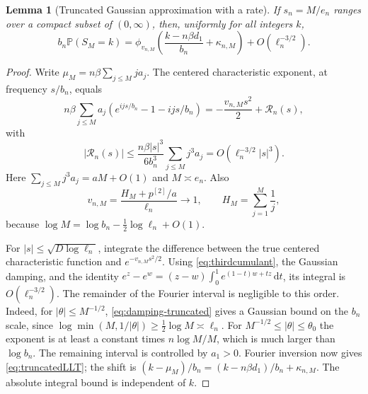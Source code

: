 \documentclass[11pt,a4paper]{article}
\numberwithin{equation}{section}
\newtheorem{lemma}[theorem]{Lemma}
\theoremstyle{definition}
\theoremstyle{remark}
\newcommand{\Prob}{\mathbb P}
\newcommand{\dd}{\,\mathrm d}
\newcommand{\ph}{\phi}
\begin{document}
\begin{lemma}[Truncated Gaussian approximation with a rate]
\label{lem:truncated}
If $s_n=M/e_n$ ranges over a compact subset of $(0,\infty)$, then,
uniformly for all integers $k$,
\begin{equation}\label{eq:truncatedLLT}
 b_n\Prob(S_M=k)
 =\ph_{v_{n,M}}\left(\frac{k-n\beta d_1}{b_n}
                         +\kappa_{n,M}\right)
       +O(\ell_n^{-3/2}).
\end{equation}
\end{lemma}
\begin{proof}
Write $\mu_M=n\beta\sum_{j\le M}j a_j$. The centered characteristic
exponent, at frequency $s/b_n$, equals
\[
 n\beta\sum_{j\le M}a_j
     (e^{ijs/b_n}-1-ijs/b_n)
   =-\frac{v_{n,M}s^2}{2}+\mathcal R_n(s),
\]
with
\begin{equation}\label{eq:thirdcumulant}
 |\mathcal R_n(s)|\le
 \frac{n\beta |s|^3}{6b_n^3}\sum_{j\le M}j^3a_j
 =O(\ell_n^{-3/2}|s|^3).
\end{equation}
Here $\sum_{j\le M}j^3a_j=aM+O(1)$ and $M\asymp e_n$.
Also
\[
 v_{n,M}=\frac{H_M+p^{[2]}/a}{\ell_n}\longrightarrow1,
 \qquad H_M=\sum_{j=1}^M\frac1j,
\]
because $\log M=\log b_n-\tfrac12\log\ell_n+O(1)$.

For $|s|\le\sqrt{D\log\ell_n}$, integrate the difference between the
true centered characteristic function and $e^{-v_{n,M}s^2/2}$.
Using \eqref{eq:thirdcumulant}, the Gaussian damping, and the identity
$e^z-e^w=(z-w)\int_0^1 e^{(1-t)w+tz}\dd t$, its integral is
$O(\ell_n^{-3/2})$. The remainder of the Fourier interval is negligible
to this order. Indeed, for $|\theta|\le M^{-1/2}$,
\eqref{eq:damping-truncated} gives a Gaussian bound on the $b_n$ scale,
since $\log\min(M,1/|\theta|)\ge\tfrac12\log M\asymp\ell_n$.
For $M^{-1/2}\le|\theta|\le\theta_0$ the exponent is at least a
constant times $n\log M/M$, which is much larger than $\log b_n$.
The remaining interval is controlled by $a_1>0$.
Fourier inversion now gives \eqref{eq:truncatedLLT}; the shift is
$(k-\mu_M)/b_n=(k-n\beta d_1)/b_n+\kappa_{n,M}$.
The absolute integral bound is independent of $k$.
\end{proof}
\end{document}
